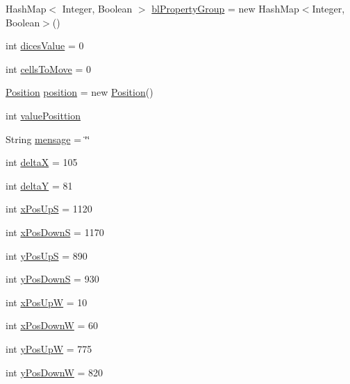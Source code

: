\begin{DoxyCompactItemize}
\item 
Hash\+Map$<$ Integer, Boolean $>$ \hyperlink{class_monopoly_1_1_logic_1_1_player_a5dd9e787dab6824e9836e2db8b659554}{bl\+Property\+Group} = new Hash\+Map$<$Integer, Boolean$>$()
\item 
int \hyperlink{class_monopoly_1_1_logic_1_1_player_a73973f9d5106195b500c2c99c7e72abd}{dices\+Value} = 0
\item 
int \hyperlink{class_monopoly_1_1_logic_1_1_player_a9b17ab340918d686bcca176f7d4da366}{cells\+To\+Move} = 0
\item 
\hyperlink{class_monopoly_1_1_logic_1_1_position}{Position} \hyperlink{class_monopoly_1_1_logic_1_1_player_a0ceb685e27e7d2e8aec76e6e247c94aa}{position} = new \hyperlink{class_monopoly_1_1_logic_1_1_position}{Position}()
\item 
int \hyperlink{class_monopoly_1_1_logic_1_1_player_a005b4707e0457444f1de5053dd9f8f70}{value\+Posittion}
\item 
String \hyperlink{class_monopoly_1_1_logic_1_1_player_ae1e9a893f8b815bc34a00c36492a8722}{mensage} = \char`\"{}\char`\"{}
\item 
int \hyperlink{class_monopoly_1_1_logic_1_1_player_a726ddcf52ccfa413b17f4e13ac876231}{deltaX} = 105
\item 
int \hyperlink{class_monopoly_1_1_logic_1_1_player_aff17704c13a3c1c22221d3af045c855f}{deltaY} = 81
\item 
int \hyperlink{class_monopoly_1_1_logic_1_1_player_a3d36c3f626d2d89c280e49d267d339d9}{x\+Pos\+UpS} = 1120
\item 
int \hyperlink{class_monopoly_1_1_logic_1_1_player_a35ae55d36ab5e3bbea32990264023827}{x\+Pos\+DownS} = 1170
\item 
int \hyperlink{class_monopoly_1_1_logic_1_1_player_aca5512a435a1aa40f6457bf1b19ba399}{y\+Pos\+UpS} = 890
\item 
int \hyperlink{class_monopoly_1_1_logic_1_1_player_a36dd6fa206f1a11c7e8b1036262f05f5}{y\+Pos\+DownS} = 930
\item 
int \hyperlink{class_monopoly_1_1_logic_1_1_player_ae9495362deb48d4844f5e380a4704ab8}{x\+Pos\+UpW} = 10
\item 
int \hyperlink{class_monopoly_1_1_logic_1_1_player_ae4fc89dc28cdbd677309aac3f379485c}{x\+Pos\+DownW} = 60
\item 
int \hyperlink{class_monopoly_1_1_logic_1_1_player_a3de6131b99c15ef2a56b99252253db7f}{y\+Pos\+UpW} = 775
\item 
int \hyperlink{class_monopoly_1_1_logic_1_1_player_a8b40694b46d41b655f5afb70991cbbfe}{y\+Pos\+DownW} = 820

\end{DoxyCompactItemize}
